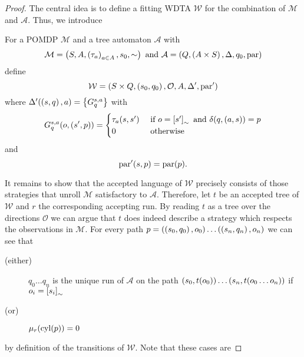 \begin{proof}
  The central idea is to define a fitting \ac{WDTA} $\mathcal{W}$ for the
  combination of $\mathcal{M}$ and $\mathcal{A}$. Thus, we introduce
  \begin{definition}
    For a \ac{POMDP} $\mathcal{M}$ and a tree automaton $\mathcal{A}$ with
    \begin{equation*}
      \mathcal{M} = \left(S,A,\left(\tau_{a}\right)_{a\in A},s_{0},\sim\right)
      \text{ and }
      \mathcal{A} = \left(Q,\left(A\times S\right),\Delta,q_{0},\operatorname{par}\right)
    \end{equation*}
    define
    \begin{equation*}
      \mathcal{W} = \left(S\times Q, \left(s_{0}, q_{0}\right), \mathcal{O}, A,
      \Delta', \operatorname{par}'\right)
    \end{equation*}
    where $\Delta'(\left(s,q\right), a) = \left\{G^{s,a}_{q}\right\}$ with
    \begin{equation*}
      G^{s,a}_{q}(o, \left(s', p\right)) = \begin{cases}
        \tau_{a}(s, s')&\text{ if }o = \left[s'\right]_{\sim}\text{ and }
        \delta(q,\left(a,s\right)) = p\\
        0&\text{ otherwise}
      \end{cases}
    \end{equation*}
    and
    \begin{equation*}
      \operatorname{par}'(s,p) = \operatorname{par}(p).
    \end{equation*}
  \end{definition}
  It remains to show that the accepted language of $\mathcal{W}$ precisely
  consists of those strategies that unroll $\mathcal{M}$ satisfactory to
  $\mathcal{A}$. Therefore, let $t$ be an accepted tree of $\mathcal{W}$ and
  $r$ the corresponding accepting run. By reading $t$ as a tree over the
  directions $\mathcal{O}$ we can argue that $t$ does indeed describe a
  strategy which respects the observations in $\mathcal{M}$. For every path
  $p = \left(\left(s_{0},q_{0}\right), o_{0}\right)\dots\left(\left(s_{n},q_{n}\right), o_{n}\right)$
  we can see that
  \begin{description}
    \item[(either)] $q_{0}\dots q_{n}$ is the unique run of $\mathcal{A}$ on
      the path $\left(s_{0}, t(o_{0})\right)\dots\left(s_{n},t(o_{0}\dots o_{n})\right)$
      if $o_{i} = \left[s_{i}\right]_{\sim}$
    \item[(or)] $\mu_{r}(\operatorname{cyl}(p)) = 0$
  \end{description}
  by definition of the transitions of $\mathcal{W}$. Note that these cases are

\end{proof}
